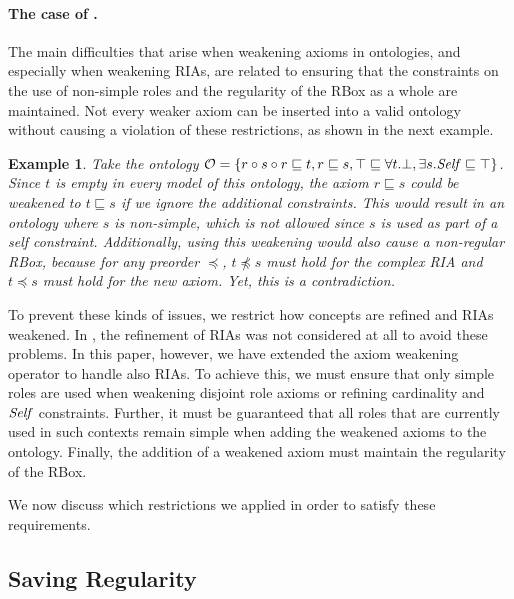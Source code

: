 \documentclass[
]{ceurart}
\newtheorem{example}{Example}
\begin{document}
\paragraph{The case of \SROIQ.}
The main difficulties that arise when weakening axioms in \SROIQ ontologies, and especially when weakening RIAs, are related to ensuring that the constraints on the use of non-simple roles and the regularity of the RBox as a whole are maintained. Not every weaker axiom can be inserted into a valid \SROIQ ontology without causing a violation of these restrictions, as shown in the next example.

\begin{example}
  Take the ontology $\mathcal{O} = \{ r \circ s \circ r \sqsubseteq t, r \sqsubseteq s, \top \sqsubseteq \forall t.\bot, \exists s.\mathit{Self} \sqsubseteq \top \}$. Since $t$ is empty in every model of this ontology, the axiom $r \sqsubseteq s$ could be weakened to $t \sqsubseteq s$ if we ignore the additional constraints. This would result in an ontology where $s$ is non-simple, which is not allowed since $s$ is used as part of a self constraint.
  Additionally, using this weakening would also cause a non-regular RBox, because for any preorder $\preceq$, $t \not\preceq s$ must hold for the complex RIA and $t \preceq s$ must hold for the new axiom. Yet, this is a contradiction.
\end{example}

To prevent these kinds of issues, we restrict how concepts are refined and RIAs weakened. In \cite{confalonieri2020towards}, the refinement of RIAs was not considered at all to avoid these problems. In this paper, however, we have extended the axiom weakening operator to handle also RIAs. To achieve this, we must ensure that only simple roles are used when weakening disjoint role axioms or refining cardinality and $\mathit{Self}$ constraints.  
%
Further, it must be guaranteed that all roles that are currently used in such contexts remain simple when adding the weakened axioms to the ontology. Finally, the addition of a weakened axiom must maintain the regularity of the RBox. 

\medskip\noindent
We now discuss which restrictions we applied in order to satisfy these requirements.

\subsection{Saving Regularity}
\end{document}
